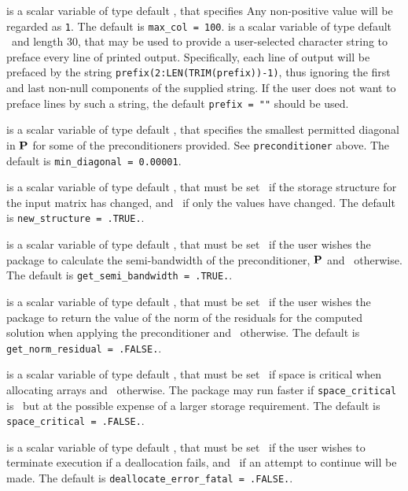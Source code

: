 \documentclass{galahad}
\begin{document}
\begin{description}
 is a scalar variable of type default \integer, that specifies
Any non-positive value will be regarded as {\tt 1}.
The default is {\tt max\_col = 100}.
 is a scalar variable of type default \character\
and length 30, that may be used to provide a user-selected
character string to preface every line of printed output.
Specifically, each line of output will be prefaced by the string
{\tt prefix(2:LEN(TRIM(prefix))-1)},
thus ignoring the first and last non-null components of the
supplied string. If the user does not want to preface lines by such
a string, the default {\tt prefix = ""} should be used.

 is a scalar variable of type default \realdp,
that specifies the smallest permitted diagonal in ${\mathbf{P}}$ for some
of the preconditioners provided. See {\tt preconditioner} above.
The default is {\tt min\_diagonal = 0.00001}.

 is a scalar variable of type default \logical,
that must be set \true\ if the storage structure for the input matrix has
changed, and \false\ if only the values have changed.
The default is {\tt new\_structure = .TRUE.}.

 is a scalar variable of type default \logical,
that must be set \true\ if the user wishes the package to calculate
the semi-bandwidth of the preconditioner, ${\mathbf{P}}$
and  \false\ otherwise.
The default is {\tt get\_semi\_bandwidth = .TRUE.}.

 is a scalar variable of type default \logical,
that must be set \true\ if the user wishes the package to return
the value of the norm of the residuals for the computed solution
when applying the preconditioner and  \false\ otherwise.
The default is {\tt get\_norm\_residual = .FALSE.}.

 is a scalar variable of type default \logical,
that must be set \true\ if space is critical when allocating arrays
and  \false\ otherwise. The package may run faster if
{\tt space\_critical} is \false\ but at the possible expense of a larger
storage requirement. The default is {\tt space\_critical = .FALSE.}.

 is a scalar variable of type default \logical,
that must be set \true\ if the user wishes to terminate execution if
a deallocation  fails, and \false\ if an attempt to continue
will be made. The default is {\tt deallocate\_error\_fatal = .FALSE.}.


\end{description}
\end{document}
